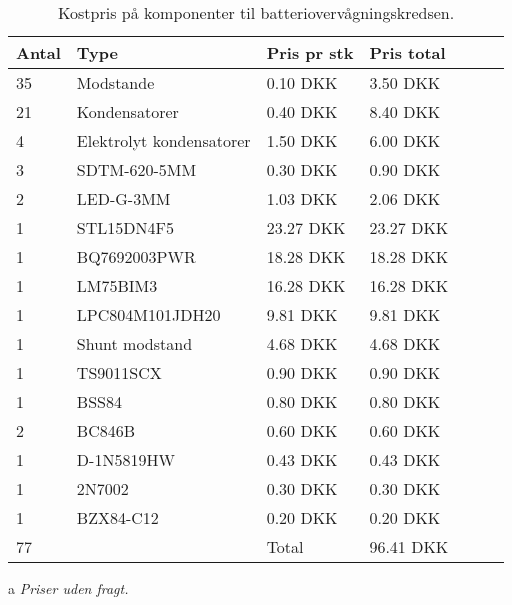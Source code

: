 \begin{table}[h!]
	\small
	\centering
	\begin{threeparttable}
		\begin{tabular}{ l l l l l l l }
			\toprule
			\multicolumn{1}{l}{\textbf{Antal}}        &
			\multicolumn{1}{l}{\textbf{Type}}         &
			\multicolumn{1}{l}{\textbf{Pris pr stk}}  &
			\multicolumn{1}{l}{\textbf{Pris total}}   \\ 
			\hline
			35 &  Modstande                 &  0.10 DKK   &  3.50 DKK  \\
			21 &  Kondensatorer             &  0.40 DKK   &  8.40 DKK  \\
			4  &  Elektrolyt kondensatorer  &  1.50 DKK   &  6.00 DKK  \\
			3  &  SDTM-620-5MM              &  0.30 DKK   &  0.90 DKK  \\
			2  &  LED-G-3MM                 &  1.03 DKK   &  2.06 DKK  \\
			1  &  STL15DN4F5                & 23.27 DKK   & 23.27 DKK  \\
			1  &  BQ7692003PWR              & 18.28 DKK   & 18.28 DKK  \\
			1  &  LM75BIM3                  & 16.28 DKK   & 16.28 DKK  \\
			1  &  LPC804M101JDH20           &  9.81 DKK   &  9.81 DKK  \\
			1  &  Shunt modstand            &  4.68 DKK   &  4.68 DKK  \\
			1  &  TS9011SCX                 &  0.90 DKK   &  0.90 DKK  \\
			1  &  BSS84                     &  0.80 DKK   &  0.80 DKK  \\
			2  &  BC846B                    &  0.60 DKK   &  0.60 DKK  \\
			1  &  D-1N5819HW                &  0.43 DKK   &  0.43 DKK  \\
			1  &  2N7002                    &  0.30 DKK   &  0.30 DKK  \\
			1  &  BZX84-C12                 &  0.20 DKK   &  0.20 DKK  \\  
			\hline
		   77  &                            & Total       & 96.41 DKK  \\  
			\hline
			\bottomrule
		\end{tabular}
		\begin{tablenotes}
			\item[a] \textit{Priser uden fragt.}
		\end{tablenotes}
		\caption{Kostpris på komponenter til batteriovervågningskredsen.}
		\label{tab:pris_ic}
	\end{threeparttable}
\end{table} 
\FloatBlock

